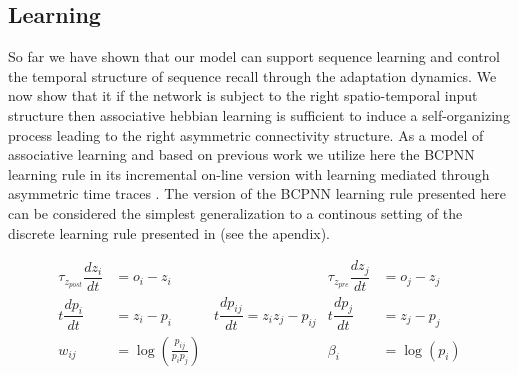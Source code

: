 \documentclass[10pt,a4paper]{article}
\begin{document}
\subsection{Learning}

So far we have shown that our model can support sequence learning and control the temporal structure of sequence recall through the adaptation dynamics. We now show that it if the network is subject to the right spatio-temporal input structure then associative hebbian learning is sufficient to induce a self-organizing process leading to the right asymmetric connectivity structure. As a model of associative learning and based on previous work we utilize here the BCPNN learning rule \cite{lansner1989one} in its incremental on-line version \cite{sandberg2002bayesian} with learning mediated through asymmetric time traces \cite{tully2016spike}. The version of the BCPNN learning rule presented here can be considered the simplest generalization to a continous setting of the discrete learning rule presented in  \cite{lansner1989one} (see the apendix). 

\begin{align}
\tau_{z_{post}} \dfrac{dz_i}{dt} &= o_i - z_i 
& \tau_{z_{pre}} \dfrac{d z_j}{dt} &= o_j - z_j \label{eq:z_traces} \\
t \dfrac{dp_i}{dt} &= z_i - p_i  
\qquad \quad t\dfrac{dp_{ij}}{dt} = z_i z_j - p_{ij}
&t\dfrac{dp_j}{dt} &= z_j - p_j    \label{eq:p_traces} \\
w_{ij} &= \log \left(\frac{p_{ij}}{p_i p_j} \right) & \beta_i &= \log(p_i) \label{eq:bcpnn} 
\end{align}
\end{document}
